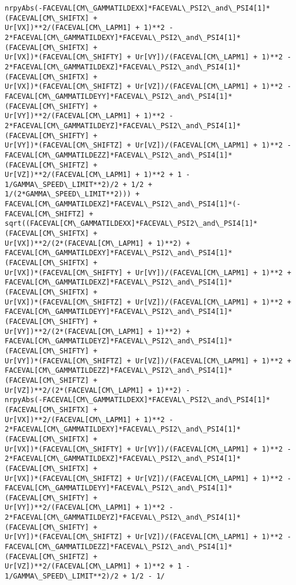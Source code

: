 \documentclass[landscape,letterpaper,10pt,english]{article}
\begin{document}
\begin{Verbatim}[commandchars=\\\{\}]
nrpyAbs(-FACEVAL[CM\_GAMMATILDEXX]*FACEVAL\_PSI2\_and\_PSI4[1]*(FACEVAL[CM\_SHIFTX] +
Ur[VX])**2/(FACEVAL[CM\_LAPM1] + 1)**2 -
2*FACEVAL[CM\_GAMMATILDEXY]*FACEVAL\_PSI2\_and\_PSI4[1]*(FACEVAL[CM\_SHIFTX] +
Ur[VX])*(FACEVAL[CM\_SHIFTY] + Ur[VY])/(FACEVAL[CM\_LAPM1] + 1)**2 -
2*FACEVAL[CM\_GAMMATILDEXZ]*FACEVAL\_PSI2\_and\_PSI4[1]*(FACEVAL[CM\_SHIFTX] +
Ur[VX])*(FACEVAL[CM\_SHIFTZ] + Ur[VZ])/(FACEVAL[CM\_LAPM1] + 1)**2 -
FACEVAL[CM\_GAMMATILDEYY]*FACEVAL\_PSI2\_and\_PSI4[1]*(FACEVAL[CM\_SHIFTY] +
Ur[VY])**2/(FACEVAL[CM\_LAPM1] + 1)**2 -
2*FACEVAL[CM\_GAMMATILDEYZ]*FACEVAL\_PSI2\_and\_PSI4[1]*(FACEVAL[CM\_SHIFTY] +
Ur[VY])*(FACEVAL[CM\_SHIFTZ] + Ur[VZ])/(FACEVAL[CM\_LAPM1] + 1)**2 -
FACEVAL[CM\_GAMMATILDEZZ]*FACEVAL\_PSI2\_and\_PSI4[1]*(FACEVAL[CM\_SHIFTZ] +
Ur[VZ])**2/(FACEVAL[CM\_LAPM1] + 1)**2 + 1 - 1/GAMMA\_SPEED\_LIMIT**2)/2 + 1/2 +
1/(2*GAMMA\_SPEED\_LIMIT**2))) +
FACEVAL[CM\_GAMMATILDEXZ]*FACEVAL\_PSI2\_and\_PSI4[1]*(-FACEVAL[CM\_SHIFTZ] +
sqrt((FACEVAL[CM\_GAMMATILDEXX]*FACEVAL\_PSI2\_and\_PSI4[1]*(FACEVAL[CM\_SHIFTX] +
Ur[VX])**2/(2*(FACEVAL[CM\_LAPM1] + 1)**2) +
FACEVAL[CM\_GAMMATILDEXY]*FACEVAL\_PSI2\_and\_PSI4[1]*(FACEVAL[CM\_SHIFTX] +
Ur[VX])*(FACEVAL[CM\_SHIFTY] + Ur[VY])/(FACEVAL[CM\_LAPM1] + 1)**2 +
FACEVAL[CM\_GAMMATILDEXZ]*FACEVAL\_PSI2\_and\_PSI4[1]*(FACEVAL[CM\_SHIFTX] +
Ur[VX])*(FACEVAL[CM\_SHIFTZ] + Ur[VZ])/(FACEVAL[CM\_LAPM1] + 1)**2 +
FACEVAL[CM\_GAMMATILDEYY]*FACEVAL\_PSI2\_and\_PSI4[1]*(FACEVAL[CM\_SHIFTY] +
Ur[VY])**2/(2*(FACEVAL[CM\_LAPM1] + 1)**2) +
FACEVAL[CM\_GAMMATILDEYZ]*FACEVAL\_PSI2\_and\_PSI4[1]*(FACEVAL[CM\_SHIFTY] +
Ur[VY])*(FACEVAL[CM\_SHIFTZ] + Ur[VZ])/(FACEVAL[CM\_LAPM1] + 1)**2 +
FACEVAL[CM\_GAMMATILDEZZ]*FACEVAL\_PSI2\_and\_PSI4[1]*(FACEVAL[CM\_SHIFTZ] +
Ur[VZ])**2/(2*(FACEVAL[CM\_LAPM1] + 1)**2) -
nrpyAbs(-FACEVAL[CM\_GAMMATILDEXX]*FACEVAL\_PSI2\_and\_PSI4[1]*(FACEVAL[CM\_SHIFTX] +
Ur[VX])**2/(FACEVAL[CM\_LAPM1] + 1)**2 -
2*FACEVAL[CM\_GAMMATILDEXY]*FACEVAL\_PSI2\_and\_PSI4[1]*(FACEVAL[CM\_SHIFTX] +
Ur[VX])*(FACEVAL[CM\_SHIFTY] + Ur[VY])/(FACEVAL[CM\_LAPM1] + 1)**2 -
2*FACEVAL[CM\_GAMMATILDEXZ]*FACEVAL\_PSI2\_and\_PSI4[1]*(FACEVAL[CM\_SHIFTX] +
Ur[VX])*(FACEVAL[CM\_SHIFTZ] + Ur[VZ])/(FACEVAL[CM\_LAPM1] + 1)**2 -
FACEVAL[CM\_GAMMATILDEYY]*FACEVAL\_PSI2\_and\_PSI4[1]*(FACEVAL[CM\_SHIFTY] +
Ur[VY])**2/(FACEVAL[CM\_LAPM1] + 1)**2 -
2*FACEVAL[CM\_GAMMATILDEYZ]*FACEVAL\_PSI2\_and\_PSI4[1]*(FACEVAL[CM\_SHIFTY] +
Ur[VY])*(FACEVAL[CM\_SHIFTZ] + Ur[VZ])/(FACEVAL[CM\_LAPM1] + 1)**2 -
FACEVAL[CM\_GAMMATILDEZZ]*FACEVAL\_PSI2\_and\_PSI4[1]*(FACEVAL[CM\_SHIFTZ] +
Ur[VZ])**2/(FACEVAL[CM\_LAPM1] + 1)**2 + 1 - 1/GAMMA\_SPEED\_LIMIT**2)/2 + 1/2 - 1/

\end{Verbatim}
\end{document}
